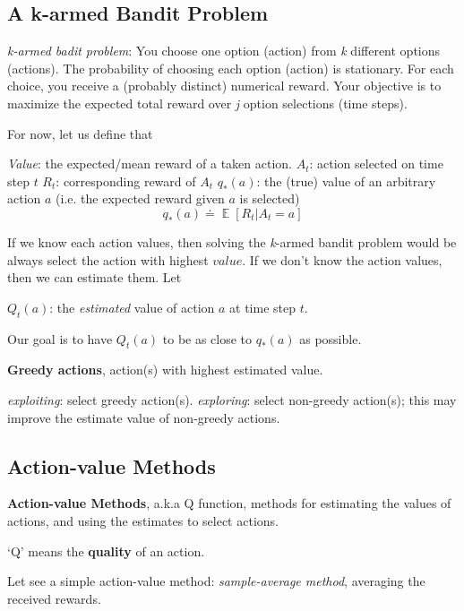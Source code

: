 \documentclass[lang=en,mode=geye,device=normal,color=blue,14pt]{elegantnote}
\DeclareMathOperator*{\E}{\mathbb{E}}
\DeclareMathOperator*{\1}{\mathbbm{1}}
\begin{document}
\subsection{A k-armed Bandit Problem}

\textit{k-armed badit problem}:
You choose one option (action) from \textit{k} different options (actions). The probability of choosing each option (action) is stationary. For each choice, you receive a (probably distinct) numerical reward. Your objective is to maximize the expected total reward over \textit{j} option selections (time steps).

For now, let us define that

\textit{Value}: the expected/mean reward of a taken action.
$A_t$: action selected on time step $t$
$R_t$: corresponding reward of $A_t$
$q_{*}(a)$: the (true) value of an arbitrary action $a$ (i.e. the expected reward given $a$ is selected) $$q_{*}(a) \doteq \E[R_t|A_t=a]$$

If we know each action values, then solving the \textit{k}-armed bandit problem would be always select the action with highest $value$.
If we don't know the action values, then we can estimate them. Let

$Q_t(a)$: the \textit{estimated} value of action $a$ at time step $t$.

Our goal is to have $Q_t(a)$ to be as close to $q_*(a)$ as possible.

\begin{definition}
\textbf{Greedy actions}, action(s) with highest estimated value.
\end{definition}
\textit{exploiting}: select greedy action(s).
\textit{exploring}: select non-greedy action(s); this may improve the estimate value of non-greedy actions.

\subsection{Action-value Methods}

\begin{definition}
\textbf{Action-value Methods}, a.k.a Q function, methods for estimating the values of actions, and using the estimates to select actions.
\end{definition}

`Q' means the \textbf{quality} of an action.

Let see a simple action-value method: \textit{sample-average method}, averaging the received rewards.
\end{document}
